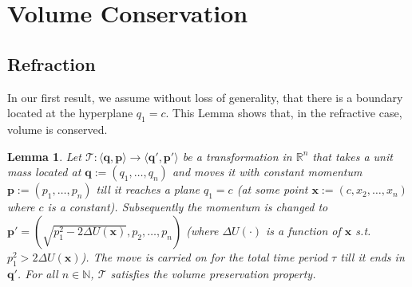 \documentclass{article} %
\newtheorem{lemma}{Lemma}
\newcommand{\tuple}[1] {\langle #1 \rangle}
\newcommand{\bvec}[1]{\textbf{#1}}
\begin{document}
\section{Volume Conservation}

\subsection{Refraction}

In our first result, we assume without loss of generality, that there is a boundary located at the hyperplane $q_1=c$.  This Lemma shows that, in the refractive case, volume is conserved.

\begin{lemma} 
\label{lemma1}
Let $\mathcal{T}: \tuple{\bvec{q}, \bvec{p}} \rightarrow \tuple{\bvec{q}', \bvec{p}'}$ be a transformation in $\mathbb{R}^n$
that takes a unit mass located at $\bvec{q} := (q_1, \ldots, q_n)$ and moves it with constant momentum $\bvec{p} := (p_1, \ldots, p_n)$ till it reaches a plane $q_1 = c$ (at some point $\bvec{x} := (c, x_2, \ldots, x_n)$ where 
$c$ is a constant).
Subsequently the momentum is changed to 
$
\bvec{p}' = \left(\sqrt{p_1^2 - 2 \Delta U(\bvec{x})}, p_2, \ldots, p_n \right)
$
(where $\Delta U(\cdot)$ is a function of $\bvec{x}$ s.t.\ $p_1^2 > 2 \Delta U(\bvec{x})$).
The move is carried on for the total time period $\tau$ till it ends in $\bvec{q}'$. 
For all $n \in \mathbb{N}$, $\mathcal{T}$ satisfies the volume preservation property.
\end{lemma}
\end{document}
